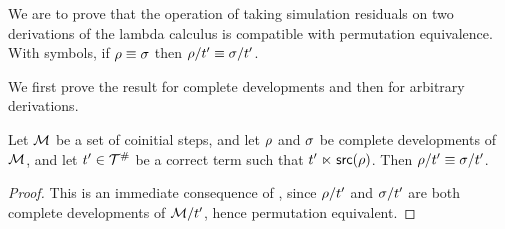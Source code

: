 We are to prove that the operation of taking simulation residuals on two
derivations of the lambda calculus is compatible with permutation equivalence.
With symbols, if $\rho \equiv \sigma$ then $\rho / t' \equiv \sigma / t'$.

We first prove the result for complete developments and then for arbitrary derivations.


\begin{lemma}
Let $\mathcal{M}$ be a set of coinitial steps,
and let $\rho$ and $\sigma$ be complete developments of $\mathcal{M}$,
and let $t' \in \mathcal{T}^{\mathtt{\#}}$ be a correct term such that $t' \mathrel{\ltimes} \mathsf{src}(\rho)$.
Then $\rho/t' \equiv \sigma/t'$.
\end{lemma}
\begin{proof}
This is an immediate consequence of ,
since $\rho/t'$ and $\sigma/t'$ are both complete developments of $\mathcal{M}/t'$,
hence permutation equivalent.
\end{proof}

